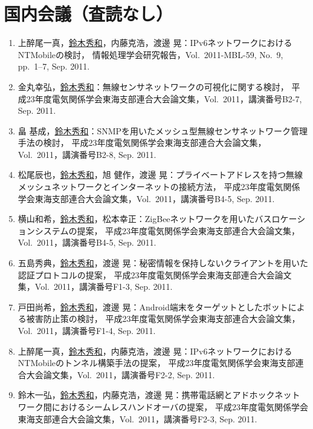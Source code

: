 \section*{国内会議（査読なし）}
\begin{enumerate}
\item 上醉尾一真，\underline{鈴木秀和}，内藤克浩，渡邊 晃：IPv6ネットワークにおけるNTMobileの検討，
情報処理学会研究報告，Vol.~2011-MBL-59, No.~9, pp.\ 1--7, Sep. 2011.

\item 金丸幸弘，\underline{鈴木秀和}：無線センサネットワークの可視化に関する検討，
平成23年度電気関係学会東海支部連合大会論文集，Vol.~2011，講演番号B2-7, Sep. 2011.

\item 畠 基成，\underline{鈴木秀和}：SNMPを用いたメッシュ型無線センサネットワーク管理手法の検討，
平成23年度電気関係学会東海支部連合大会論文集，Vol.~2011，講演番号B2-8, Sep. 2011.

\item 松尾辰也，\underline{鈴木秀和}，旭 健作，渡邊 晃：プライベートアドレスを持つ無線メッシュネットワークとインターネットの接続方法，
平成23年度電気関係学会東海支部連合大会論文集，Vol.~2011，講演番号B4-5, Sep. 2011.

\item 横山和希，\underline{鈴木秀和}，松本幸正：ZigBeeネットワークを用いたバスロケーションシステムの提案，
平成23年度電気関係学会東海支部連合大会論文集，Vol.~2011，講演番号B4-5, Sep. 2011.

\item 五島秀典，\underline{鈴木秀和}，渡邊 晃：秘密情報を保持しないクライアントを用いた認証プロトコルの提案，
平成23年度電気関係学会東海支部連合大会論文集，Vol.~2011，講演番号F1-3, Sep. 2011.

\item 戸田尚希，\underline{鈴木秀和}，渡邊 晃：Android端末をターゲットとしたボットによる被害防止策の検討，
平成23年度電気関係学会東海支部連合大会論文集，Vol.~2011，講演番号F1-4, Sep. 2011.

\item 上醉尾一真，\underline{鈴木秀和}，内藤克浩，渡邊 晃：IPv6ネットワークにおけるNTMobileのトンネル構築手法の提案，
平成23年度電気関係学会東海支部連合大会論文集，Vol.~2011，講演番号F2-2, Sep. 2011.

\item 鈴木一弘，\underline{鈴木秀和}，内藤克浩，渡邊 晃：携帯電話網とアドホックネットワーク間におけるシームレスハンドオーバの提案，
平成23年度電気関係学会東海支部連合大会論文集，Vol.~2011，講演番号F2-3, Sep. 2011.


\end{enumerate}
